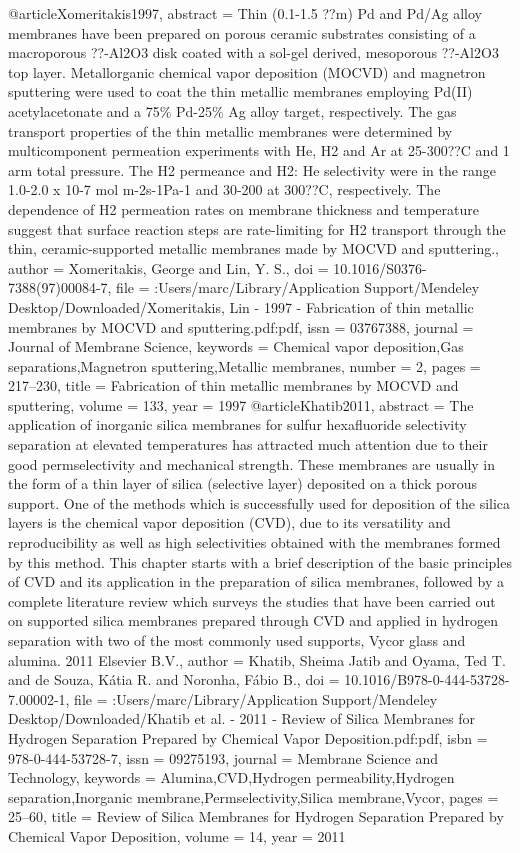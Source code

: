 @article{Xomeritakis1997,
abstract = {Thin (0.1-1.5 ??m) Pd and Pd/Ag alloy membranes have been prepared on porous ceramic substrates consisting of a macroporous ??-Al2O3 disk coated with a sol-gel derived, mesoporous ??-Al2O3 top layer. Metallorganic chemical vapor deposition (MOCVD) and magnetron sputtering were used to coat the thin metallic membranes employing Pd(II) acetylacetonate and a 75{\%} Pd-25{\%} Ag alloy target, respectively. The gas transport properties of the thin metallic membranes were determined by multicomponent permeation experiments with He, H2 and Ar at 25-300??C and 1 arm total pressure. The H2 permeance and H2: He selectivity were in the range 1.0-2.0 x 10-7 mol m-2s-1Pa-1 and 30-200 at 300??C, respectively. The dependence of H2 permeation rates on membrane thickness and temperature suggest that surface reaction steps are rate-limiting for H2 transport through the thin, ceramic-supported metallic membranes made by MOCVD and sputtering.},
author = {Xomeritakis, George and Lin, Y. S.},
doi = {10.1016/S0376-7388(97)00084-7},
file = {:Users/marc/Library/Application Support/Mendeley Desktop/Downloaded/Xomeritakis, Lin - 1997 - Fabrication of thin metallic membranes by MOCVD and sputtering.pdf:pdf},
issn = {03767388},
journal = {Journal of Membrane Science},
keywords = {Chemical vapor deposition,Gas separations,Magnetron sputtering,Metallic membranes},
number = {2},
pages = {217--230},
title = {{Fabrication of thin metallic membranes by MOCVD and sputtering}},
volume = {133},
year = {1997}
}
@article{Khatib2011,
abstract = {The application of inorganic silica membranes for sulfur hexafluoride selectivity separation at elevated temperatures has attracted much attention due to their good permselectivity and mechanical strength. These membranes are usually in the form of a thin layer of silica (selective layer) deposited on a thick porous support. One of the methods which is successfully used for deposition of the silica layers is the chemical vapor deposition (CVD), due to its versatility and reproducibility as well as high selectivities obtained with the membranes formed by this method. This chapter starts with a brief description of the basic principles of CVD and its application in the preparation of silica membranes, followed by a complete literature review which surveys the studies that have been carried out on supported silica membranes prepared through CVD and applied in hydrogen separation with two of the most commonly used supports, Vycor glass and alumina. {\textcopyright} 2011 Elsevier B.V.},
author = {Khatib, Sheima Jatib and Oyama, Ted T. and de Souza, K{\'{a}}tia R. and Noronha, F{\'{a}}bio B.},
doi = {10.1016/B978-0-444-53728-7.00002-1},
file = {:Users/marc/Library/Application Support/Mendeley Desktop/Downloaded/Khatib et al. - 2011 - Review of Silica Membranes for Hydrogen Separation Prepared by Chemical Vapor Deposition.pdf:pdf},
isbn = {978-0-444-53728-7},
issn = {09275193},
journal = {Membrane Science and Technology},
keywords = {Alumina,CVD,Hydrogen permeability,Hydrogen separation,Inorganic membrane,Permselectivity,Silica membrane,Vycor},
pages = {25--60},
title = {{Review of Silica Membranes for Hydrogen Separation Prepared by Chemical Vapor Deposition}},
volume = {14},
year = {2011}
}
